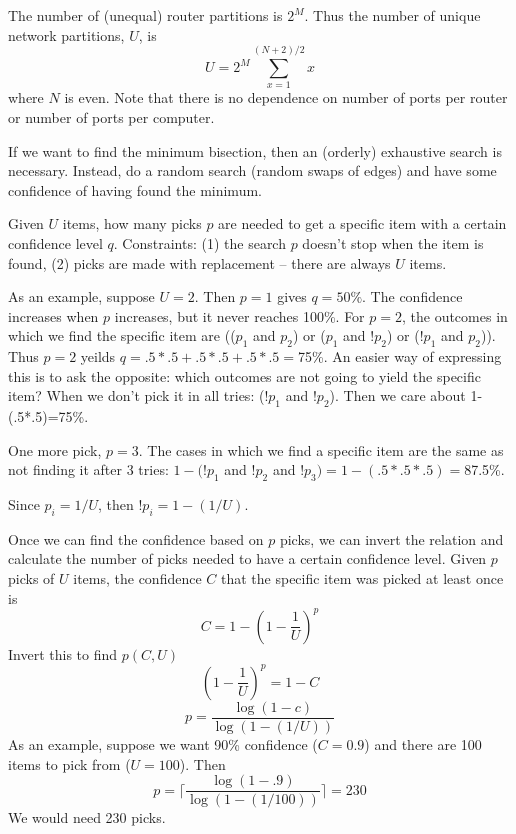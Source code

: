 \documentclass[pdftex]{article}
\begin{document}
The number of (unequal) router partitions is $2^M$. Thus the number of unique network partitions, $U$, is
\begin{equation}
 U = 2^M \sum_{x=1}^{(N+2)/2}x
\end{equation}
where $N$ is even. Note that there is no dependence on number of ports per router or number of ports per computer.

If we want to find the minimum bisection, then an (orderly) exhaustive search is necessary. Instead, do a random search (random swaps of edges) and have some confidence of having found the minimum.

Given $U$ items, how many picks $p$ are needed to get a specific item with a certain confidence level $q$. Constraints: (1) the search $p$ doesn't stop when the item is found, (2) picks are made with replacement -- there are always $U$ items.

As an example, suppose $U=2$. Then $p=1$ gives $q=50\%$. The confidence increases when $p$ increases, but it never reaches 100\%. For $p=2$, the outcomes in which we find the specific item are
 (($p_1$ and $p_2$) or ($p_1$ and $!p_2$) or ($!p_1$ and $p_2$)). Thus $p=2$ yeilds $q=.5*.5+.5*.5+.5*.5=$75\%. An easier way of expressing this is to ask the opposite: which outcomes are not going to yield the specific item? When we don't pick it in all tries: ($!p_1$ and $!p_2$). Then we care about 1-(.5*.5)=75\%.

One more pick, $p=3$. The cases in which we find a specific item are the same as not finding it after 3 tries: $1-(!p_1$ and $!p_2$ and $!p_3)=1-(.5*.5*.5)=$87.5\%. 

Since $p_i=1/U$, then $!p_i=1-(1/U)$.
 
Once we can find the confidence based on $p$ picks, we can invert the relation and calculate the number of picks needed to have a certain confidence level. Given $p$ picks of $U$ items, the confidence $C$ that the specific item was picked at least once is
\begin{equation}
 C = 1 - \left(1-\frac{1}{U}\right)^p
\end{equation}
Invert this to find $p(C,U)$
\begin{equation}
  \left(1-\frac{1}{U}\right)^p = 1-C
\end{equation}
\begin{equation}
 p = \frac{\log(1-c)}{\log(1-(1/U))}
\end{equation}
As an example, suppose we want 90\% confidence ($C=0.9$) and there are 100 items to pick from ($U=100$). Then
\begin{equation}
 p = \lceil\frac{\log(1-.9)}{\log(1-(1/100))}\rceil = 230
\end{equation}
We would need 230 picks.
\end{document}
